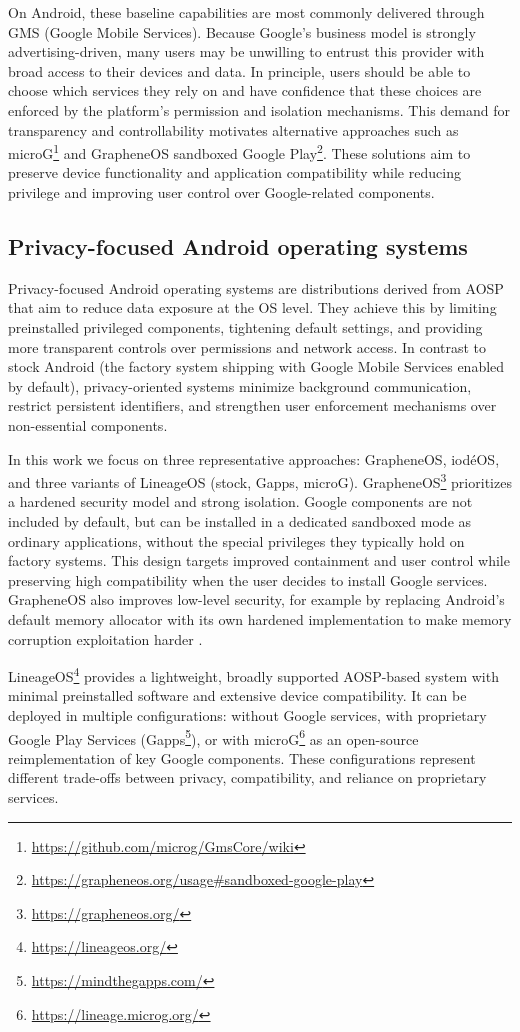 On Android, these baseline capabilities are most commonly delivered through GMS (Google Mobile Services). Because Google’s business model is strongly advertising-driven, many users may be unwilling to entrust this provider with broad access to their devices and data. In principle, users should be able to choose which services they rely on and have confidence that these choices are enforced by the platform’s permission and isolation mechanisms. This demand for transparency and controllability motivates alternative approaches such as microG\footnote{\url{https://github.com/microg/GmsCore/wiki}} and GrapheneOS sandboxed Google Play\footnote{\url{https://grapheneos.org/usage#sandboxed-google-play}}. These solutions aim to preserve device functionality and application compatibility while reducing privilege and improving user control over Google-related components.

\subsection{Privacy-focused Android operating systems}
Privacy-focused Android operating systems are distributions derived from AOSP that aim to reduce data exposure at the OS level. They achieve this by limiting preinstalled privileged components, tightening default settings, and providing more transparent controls over permissions and network access. In contrast to stock Android (the factory system shipping with Google Mobile Services enabled by default), privacy-oriented systems minimize background communication, restrict persistent identifiers, and strengthen user enforcement mechanisms over non-essential components.

In this work we focus on three representative approaches: GrapheneOS, iod\'eOS, and three variants of LineageOS (stock, Gapps, microG). GrapheneOS\footnote{\url{https://grapheneos.org/}} prioritizes a hardened security model and strong isolation. Google components are not included by default, but can be installed in a dedicated sandboxed mode as ordinary applications, without the special privileges they typically hold on factory systems. This design targets improved containment and user control while preserving high compatibility when the user decides to install Google services. GrapheneOS also improves low-level security, for example by replacing Android’s default memory allocator with its own hardened implementation to make memory corruption exploitation harder \cite{graphene-hardened}.

LineageOS\footnote{\url{https://lineageos.org/}} provides a lightweight, broadly supported AOSP-based system with minimal preinstalled software and extensive device compatibility. It can be deployed in multiple configurations: without Google services, with proprietary Google Play Services (Gapps\footnote{\url{https://mindthegapps.com/}}), or with microG\footnote{\url{https://lineage.microg.org/}} as an open-source reimplementation of key Google components. These configurations represent different trade-offs between privacy, compatibility, and reliance on proprietary services.

